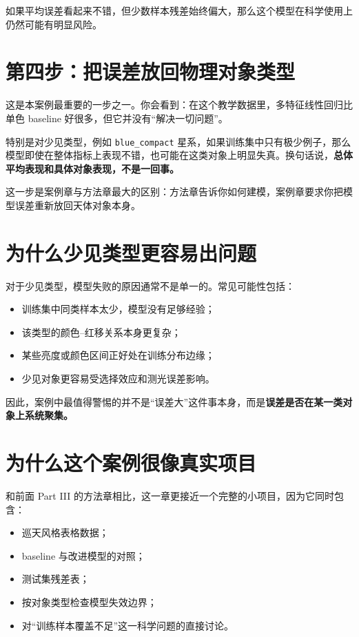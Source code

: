 如果平均误差看起来不错，但少数样本残差始终偏大，那么这个模型在科学使用上仍然可能有明显风险。

\section{第四步：把误差放回物理对象类型}

这是本案例最重要的一步之一。你会看到：在这个教学数据里，多特征线性回归比单色 baseline 好很多，但它并没有“解决一切问题”。

特别是对少见类型，例如 \texttt{blue\_compact} 星系，如果训练集中只有极少例子，那么模型即使在整体指标上表现不错，也可能在这类对象上明显失真。换句话说，\textbf{总体平均表现和具体对象表现，不是一回事。}

这一步是案例章与方法章最大的区别：方法章告诉你如何建模，案例章要求你把模型误差重新放回天体对象本身。

\section{为什么少见类型更容易出问题}

对于少见类型，模型失败的原因通常不是单一的。常见可能性包括：

\begin{itemize}
    \item 训练集中同类样本太少，模型没有足够经验；
    \item 该类型的颜色--红移关系本身更复杂；
    \item 某些亮度或颜色区间正好处在训练分布边缘；
    \item 少见对象更容易受选择效应和测光误差影响。
\end{itemize}

因此，案例中最值得警惕的并不是“误差大”这件事本身，而是\textbf{误差是否在某一类对象上系统聚集。}

\section{为什么这个案例很像真实项目}

和前面 Part III 的方法章相比，这一章更接近一个完整的小项目，因为它同时包含：

\begin{itemize}
    \item 巡天风格表格数据；
    \item baseline 与改进模型的对照；
    \item 测试集残差表；
    \item 按对象类型检查模型失效边界；
    \item 对“训练样本覆盖不足”这一科学问题的直接讨论。
\end{itemize}

